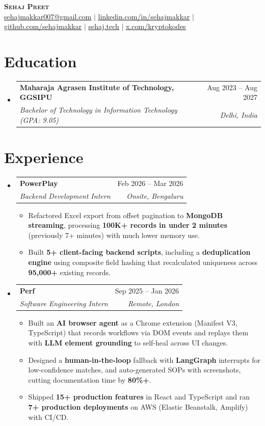 \documentclass[letterpaper,11pt]{article}
\makeatletter
\newcommand{\resumeItem}[1]{\item\small{{#1 \vspace{-2pt}}}}
\newcommand{\resumeSubheading}[4]{
  \vspace{-2pt}\item
    \begin{tabular*}{0.97\textwidth}[t]{l@{\extracolsep{\fill}}r}
      \textbf{#1} & #2 \\
      \textit{\small#3} & \textit{\small #4} \\
    \end{tabular*}\vspace{-7pt}}
\newcommand{\resumeSubHeadingListStart}{\begin{itemize}[leftmargin=0.15in, label={}]}
\newcommand{\resumeSubHeadingListEnd}{\end{itemize}}
\newcommand{\resumeItemListStart}{\begin{itemize}}
\newcommand{\resumeItemListEnd}{\end{itemize}\vspace{-5pt}}
\makeatother
\begin{document}
\begin{center}
    \textbf{\Huge \scshape Sehaj Preet} \\ \vspace{1pt}
    \small \href{mailto:sehajmakkar007@gmail.com}{\underline{sehajmakkar007@gmail.com}} $|$
    \href{https://linkedin.com/in/sehajmakkar}{\underline{linkedin.com/in/sehajmakkar}} $|$
    \href{https://github.com/sehajmakkar}{\underline{github.com/sehajmakkar}} $|$
    \href{https://sehaj.tech}{\underline{sehaj.tech}} $|$
    \href{https://x.com/kryptokodes}{\underline{x.com/kryptokodes}}
\end{center}

\section{Education}
  \resumeSubHeadingListStart
    \resumeSubheading
      {Maharaja Agrasen Institute of Technology, GGSIPU}{Aug 2023 -- Aug 2027}
      {Bachelor of Technology in Information Technology (GPA: 9.05)}{Delhi, India}
  \resumeSubHeadingListEnd

\section{Experience}
  \resumeSubHeadingListStart
    \resumeSubheading{PowerPlay}{Feb 2026 -- Mar 2026}{Backend Development Intern}{Onsite, Bengaluru}
      \resumeItemListStart
        \resumeItem{Refactored Excel export from offset pagination to \textbf{MongoDB streaming}, processing \textbf{100K+ records in under 2 minutes} (previously 7+ minutes) with much lower memory use.}
        \resumeItem{Built \textbf{5+ client-facing backend scripts}, including a \textbf{deduplication engine} using composite field hashing that recalculated uniqueness across \textbf{95,000+} existing records.}
      \resumeItemListEnd
    \resumeSubheading{Perf}{Sep 2025 -- Jan 2026}{Software Engineering Intern}{Remote, London}
      \resumeItemListStart
        \resumeItem{Built an \textbf{AI browser agent} as a Chrome extension (Manifest V3, TypeScript) that records workflows via DOM events and replays them with \textbf{LLM element grounding} to self-heal across UI changes.}
        \resumeItem{Designed a \textbf{human-in-the-loop} fallback with \textbf{LangGraph} interrupts for low-confidence matches, and auto-generated SOPs with screenshots, cutting documentation time by \textbf{80\%+}.}
        \resumeItem{Shipped \textbf{15+ production features} in React and TypeScript and ran \textbf{7+ production deployments} on AWS (Elastic Beanstalk, Amplify) with CI/CD.}
      \resumeItemListEnd
  \resumeSubHeadingListEnd
\end{document}
